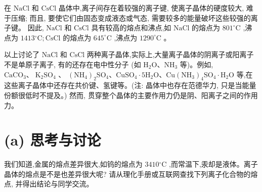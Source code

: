 \documentclass[10pt]{article}
\begin{document}
在 \(\mathrm{{NaCl}}\) 和 \(\mathrm{{CsCl}}\) 晶体中,离子间存在着较强的离子键, 使离子晶体的硬度较大, 难于压缩; 而且, 要使它们由固态变成液态或气态, 需要较多的能量破坏这些较强的离子键。 因此, \(\mathrm{{NaCl}}\) 和 \(\mathrm{{CsCl}}\) 具有较高的熔点和沸点,如 \(\mathrm{{NaCl}}\) 的熔点为 \({801}^{ \circ }\mathrm{C}\) ,沸点为 \({1413}{}^{ \circ }\mathrm{C};\mathrm{{CsCl}}\) 的熔点为 \({645}^{ \circ }\mathrm{C}\) ,沸点为 \({1290}^{ \circ }\mathrm{C}\) 。

以上讨论了 \(\mathrm{{NaCl}}\) 和 \(\mathrm{{CsCl}}\) 两种离子晶体,实际上,大量离子晶体的阴离子或阳离子不是单原子离子, 有的还存在电中性分子 (如 \({\mathrm{H}}_{2}\mathrm{O}\text{、}{\mathrm{{NH}}}_{3}\) 等)。例如, \({\mathrm{{CaCO}}}_{3}\text{、}{\mathrm{\;K}}_{2}{\mathrm{{SO}}}_{4}\) 、 \({\left( {\mathrm{{NH}}}_{4}\right) }_{2}{\mathrm{{SO}}}_{4}\text{、}{\mathrm{{CuSO}}}_{4} \cdot 5{\mathrm{H}}_{2}\mathrm{O}\text{、}\mathrm{{Cu}}{\left( {\mathrm{{NH}}}_{3}\right) }_{4}{\mathrm{{SO}}}_{4} \cdot {\mathrm{H}}_{2}\mathrm{O}\) 等,在这些离子晶体中还存在共价键、氢键等。(注: 晶体中也存在范德华力, 只是当能量份额很低时不提及。) 然而, 贯穿整个晶体的主要作用力仍是阴、阳离子之间的作用力。

\section*{(a) 思考与讨论}

我们知道,金属的熔点差异很大,如钨的熔点为 \({3410}{}^{ \circ }\mathrm{C}\) ,而常温下,汞却是液体。离子晶体的熔点是不是也差异很大呢? 请从理化手册或互联网查找下列离子化合物的熔点, 并得出结论与同学交流。

\begin{center}
\end{center}
\end{document}
